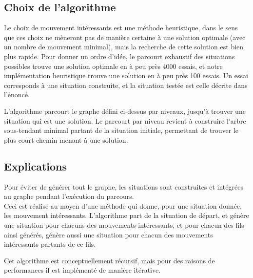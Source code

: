 \documentclass{article}
\begin{document}
    \subsection{Choix de l'algorithme}
		Le choix de mouvement intéressants est une méthode heuristique, dans le sens que ces choix ne mèneront pas de manière certaine
		à une solution optimale (avec un nombre de mouvement minimal), mais la recherche de cette solution est bien plus rapide.
		Pour donner un ordre d'idée, le parcourt exhaustif des situations possibles trouve une solution optimale en à peu près 4000 essais,
		et notre implémentation heuristique trouve une solution en à peu près 100 essais. Un essai corresponds à une situation construite,
		et la situation testée est celle décrite dans l'énoncé.

		L'algorithme parcourt le graphe défini ci-dessus par niveaux, jusqu'à trouver une situation qui est une solution.
		Le parcourt par niveau revient à construire l'arbre sous-tendant minimal partant de la situation initiale,
		permettant de trouver le plus court chemin menant à une solution.

    \subsection{Explications}
		Pour éviter de générer tout le graphe, les situations sont construites et intégrées au graphe pendant l'exécution du parcours. \\
		Ceci est réalisé au moyen d'une méthode qui donne, pour une situation donnée, les mouvement intéressants.
		L'algorithme part de la situation de départ, et génère une situation pour chacuns des mouvements intéressants, 
		et pour chacun des fils ainsi générés, génère aussi une situation pour chacun des mouvements intéressants partants de ce fils.

		Cet algorithme est conceptuellement récursif, mais pour des raisons de performances il est implémenté de manière itérative.
\end{document}
